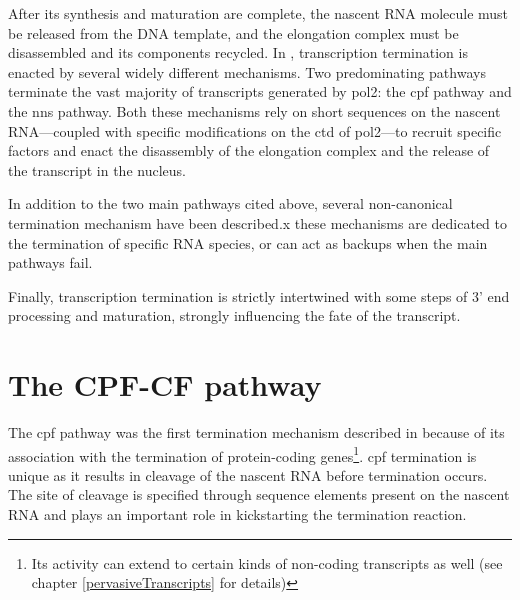 \label{termination}
After its synthesis and maturation are complete, the nascent RNA molecule must be released from the DNA template, and the elongation complex must be disassembled and its components recycled.
In \cer{}, transcription termination is enacted by several widely different mechanisms.
Two predominating pathways terminate the vast majority of transcripts generated by \acrlong{pol2}: the \gls{cpf} pathway and the \gls{nns}  pathway. 
Both these mechanisms rely on short sequences on the nascent RNA---coupled with specific modifications on the \gls{ctd} of \gls{pol2}---to recruit specific factors and enact the disassembly of the elongation complex and the release of the transcript in the nucleus.

In addition to the two main pathways cited above, several non-canonical termination mechanism have been described.x
these mechanisms are dedicated to the termination of specific RNA species, or can act as backups when the main pathways fail.


Finally, transcription termination is strictly intertwined with some steps of 3' end processing and maturation, strongly influencing the fate of the transcript. 



\section{The CPF-CF pathway}
The \gls{cpf} pathway was the first termination mechanism described in \cer{} because of its association with the termination of protein-coding genes\footnote{Its activity can extend to certain kinds of non-coding transcripts as well (see chapter \ref{pervasiveTranscripts} for details)}. 
\gls{cpf} termination is unique as it results in cleavage of the nascent RNA before termination occurs.
The site of cleavage is specified through sequence elements present on the nascent RNA and plays an important role in kickstarting the termination reaction.

